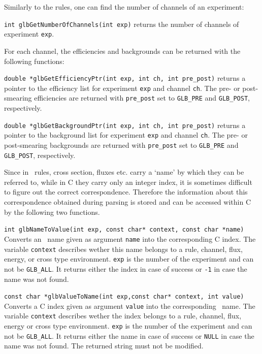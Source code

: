 %
Similarly to the rules, one can find the number of channels of an experiment:
\begin{function}
{\tt int glbGetNumberOfChannels(int exp)} returns the number of 
channels of experiment {\tt exp}.
\end{function} 
For each channel, the efficiencies and backgrounds can be returned with the following functions:
\begin{function}
{\tt double *glbGetEfficiencyPtr(int exp, int ch, int pre\_post)} returns a pointer to
the efficiency list for experiment {\tt exp} and channel {\tt ch}. The pre- or post-smearing
efficiencies are returned with {\tt pre\_post} set to {\tt GLB\_PRE} and {\tt GLB\_POST}, respectively.
\end{function}
\begin{function}
{\tt double *glbGetBackgroundPtr(int exp, int ch, int pre\_post)} returns a pointer to
the background list for experiment {\tt exp} and channel {\tt ch}. The pre- or post-smearing
backgrounds are returned with {\tt pre\_post} set to {\tt GLB\_PRE} and {\tt GLB\_POST}, respectively.
\end{function}

Since in \AEDL\, rules, cross section, fluxes etc. carry a `name' by
which they can be referred to, while in C they carry only an integer
index, it is sometimes difficult to figure out the correct correspondence.
Therefore the information about this correspondence obtained during
parsing is stored and can be accessed within C by the following two functions.
\begin{function}
{\tt int glbNameToValue(int exp, const char* context, const char *name)}
Converts an \AEDL\ name given as argument {\tt name} into the corresponding
C index. The variable {\tt context} describes wether this name belongs
to a rule, channel, flux, energy, or cross type environment. {\tt exp}
is the number of the experiment and can not be {\tt GLB\_ALL}. It returns
either the index in case of success or {\tt -1} in case the name was not
found. 
\end{function}

\begin{function}
{\tt const char *glbValueToName(int exp,const char* context, int value)}
Converts a C index given as argument {\tt value} into the corresponding 
\AEDL\ name. The variable {\tt context} describes wether the index belongs
to a rule, channel, flux, energy or cross type environment. {\tt exp}
is the number of the experiment and can not be {\tt GLB\_ALL}. It returns
either the name in case of success or {\tt NULL} in case the name was not
found. The returned string must not be modified.
\end{function}





